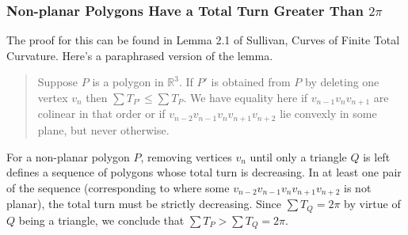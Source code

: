 \documentclass{article}
\begin{document}
\subsubsection{Non-planar Polygons Have a Total Turn Greater Than \(2\pi\)} \label{non-planar}

The proof for this can be found in Lemma 2.1 of Sullivan, Curves of Finite Total Curvature.\textsuperscript{\cite{sullivan}} Here's a paraphrased version of the lemma.

\begin{quotation}
	Suppose \(P\) is a polygon in \(\mathbb{R}^3\). If \(P'\) is obtained from \(P\) by deleting one vertex \(v_n\) then \(\sum T_{P'} \leq \sum T_P\). We have equality here if \(v_{n-1} v_n v_{n+1}\) are colinear in that order or if \(v_{n-2} v_{n-1} v_n v_{n+1} v_{n+2}\) lie convexly in some plane, but never otherwise.
\end{quotation}

For a non-planar polygon \(P\), removing vertices \(v_n\) until only a triangle \(Q\) is left defines a sequence of polygons whose total turn is decreasing. In at least one pair of the sequence (corresponding to where some \(v_{n-2} v_{n-1} v_{n} v_{n+1} v_{n+2}\) is not planar), the total turn must be strictly decreasing.  Since \(\sum T_Q = 2\pi\) by virtue of \(Q\) being a triangle, we conclude that  \(\sum T_P > \sum T_Q = 2\pi\).



\end{document}
